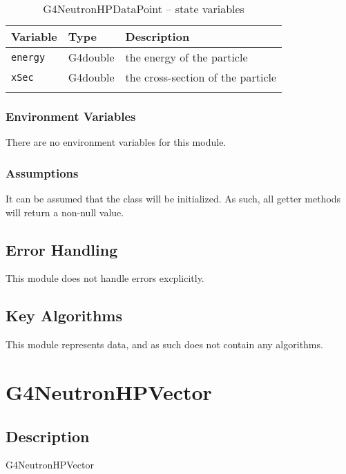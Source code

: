 \documentclass[12pt]{article}
\begin{document}
\begin{table}[h]
\caption{G4NeutronHPDataPoint -- state variables}\label{Table_NeutronHPDataPointStateVariables}
\begin{tabularx}{\textwidth}{llX}
\toprule
\bf Variable & \bf Type & \bf Description\\\midrule
\arrayrulecolor{lightgray}
\texttt{energy} & G4double & the energy of the particle \\\hline
\texttt{xSec}   & G4double & the cross-section of the particle \\
\arrayrulecolor{black}
\bottomrule
\end{tabularx}
\end{table}

\subsubsection{Environment Variables}%
There are no environment variables for this module.

\subsubsection{Assumptions}%
It can be assumed that the class will be initialized. As such, all getter methods will return a non-null value.

\subsection{Error Handling}
This module does not handle errors excplicitly.

\subsection{Key Algorithms}
This module represents data, and as such does not contain any algorithms.



\section{G4NeutronHPVector}

\subsection{Description}
G4NeutronHPVector
\end{document}
